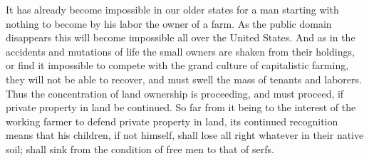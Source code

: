 \documentclass{book}
\begin{document}
It has already become impossible in our older states for a man starting with nothing to become by his labor the owner of a farm. As the public domain disappears this will become impossible all over the United States. And as in the accidents and mutations of life the small owners are shaken from their holdings, or find it impossible to compete with the grand culture of capitalistic farming, they will not be able to recover, and must swell the mass of tenants and laborers. Thus the concentration of land ownership is proceeding, and must proceed, if private property in land be continued. So far from it being to the interest of the working farmer to defend private property in land, its continued recognition means that his children, if not himself, shall lose all right whatever in their native soil; shall sink from the condition of free men to that of serfs.
\end{document}
